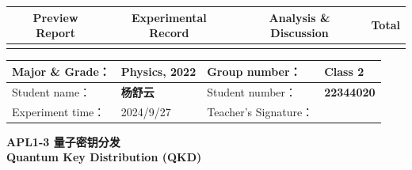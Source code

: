 


\begin{table}
	\renewcommand\arraystretch{1.7}
	\begin{tabularx}{\textwidth}{
			|X|X|X|X
			|X|X|X|X|}
		\hline
		\multicolumn{2}{|c|}{Preview Report}&\multicolumn{2}{|c|}{Experimental Record}&\multicolumn{2}{|c|}{Analysis \& Discussion}&\multicolumn{2}{|c|}{\Large\textbf{Total}}\\
		\hline
		\LARGE & & \LARGE & & \LARGE & & \LARGE & \\
		\hline
	\end{tabularx}
\end{table}


\begin{table}
	\renewcommand\arraystretch{1.7}
	\begin{tabularx}{\textwidth}{|X|X|X|X|}
		\hline
		Major \& Grade： & Physics, 2022 &Group number： & Class 2\\
		\hline
		Student name： & \textbf{杨舒云}  & Student number： & \textbf{22344020}\\
		\hline
		Experiment time： & 2024/9/27 & Teacher's Signature： & \\
		\hline
	\end{tabularx}
\end{table}


\begin{center}
	\Huge \textbf{APL1-3 \quad 量子密钥分发\\Quantum Key Distribution (QKD)}
\end{center}


